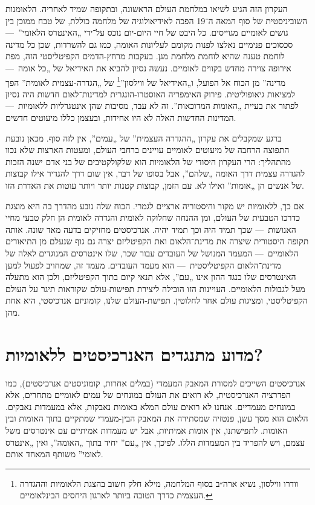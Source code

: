 העקרון הזה הגיע לשיאו במלחמת העולם הראשונה, ובתקופה שמיד לאחריה. הלאומנות השוביניסטית של סוף המאה ה־19 הפכה לאידיאולוגיה של מלחמה כוללת, של טבח ממוכן בין גושים לאומיים מגוייסים. כל היבט של חיי היום-יום נוכס על־ידי „האינטרס הלאומי”~— סכסוכים פנימיים נאלצו לפנות מקומם לעליונות האומה, כמו גם להשרדות, שכן כל מדינה לוחמת טענה שהיא לוחמת מלחמת מגן. בעקבות מרחץ-הדמים הקפיטליסטי הזה, מפת אירופה צוירה מחדש בקווים לאומיים. נעשה נסיון להביא את האידיאל של „כל אומה~— מדינה” מן הכוח אל הפועל, ו„האידיאל של ווילסון”\footnote{וודרו ווילסון, נשיא ארה״ב בסוף המלחמה, מילא חלק חשוב בהצגת הלאומיות וההגדרה העצמית כדרך הטובה ביותר לארגון היחסים הבינלאומיים.} של „הגדרה-עצמית לאומית” הפך למציאות גיאופוליטית. פירוק האימפריה האוסטרו-הונגרית למדינות־לאום חדשות היה נסיון לפתור את בעיית „האומות המדוכאות”. זה לא עבד, מסיבות שהן אינטגרליות ללאומיות~— המדינות החדשות האלה לא היו אחידות, ובעצמן כללו מיעוטים חדשים.

ברגע שמקבלים את עקרון „ההגדרה העצמית” של „עמים”, אין לזה סוף. מכאן נובעת התפוצה הרחבה של מיעוטים לאומיים עויינים ברחבי העולם, ומעטות הארצות שלא נכוו מהתהליך: הרי העקרון היסודי של הלאומיות הוא שלקולקטיבים של בני אדם ישנה הזכות להגדרה עצמית דרך האומה „שלהם”, אבל בסופו של דבר, אין שום דרך להגדיר אילו קבוצות של אנשים הן „אומות” ואילו לא. עם הזמן, קבוצות קטנות יותר ויותר עוטות את האדרת הזו.

אם כך, ללאומיות יש מקור והיסטוריה ארציים לגמרי. הכוח שלה נובע מהדרך בה היא מוצגת כדרכו הטבעית של העולם, ומן ההנחה שחלוקה לאומית והגדרה לאומית הן חלק טבעי מחיי האנושות~— שכך תמיד היה וכך תמיד יהיה. אנרכיסטים מחזיקים בדעה מאד שונה. אותה תקופה היסטורית שיצרה את מדינת־הלאום ואת הקפיטליזם יצרה גם גוף שנעלם מן התיאורים הלאומיים~— המעמד המנושל של העובדים עבור שכר, שלו אינטרסים המנוגדים לאלה של מדינת־הלאום הקפיטליסטית~— הוא מעמד העובדים. מעמד זה, שמחויב לפעול למען האינטרסים שלו כנגד ההון אינו „עם”, אלא תנאי קיום בתוך הקפיטליזם, ולכן הוא מתעלה מעל לגבולות הלאומיים. העויינות הזו הובילה ליצירת תפישות-עולם שקוראות תיגר על העולם הקפיטליסטי, ומציגות עולם אחר לחלוטין. תפישת-העולם שלנו, קומוניזם אנרכיסטי, היא אחת מהן.



\section*{מדוע מתנגדים האנרכיסטים ללאומיות?}

אנרכיסטים השייכים למסורת המאבק המעמדי (במלים אחרות, קומוניסטים אנרכיסטים), כמו הפדרציה האנרכיסטית, לא רואים את העולם במונחים של עמים לאומיים מתחרים, אלא במונחים מעמדיים. אנחנו לא רואים עולם המלא באומות נאבקות, אלא במעמדות נאבקים. הלאום הוא מסך עשן, פנטזיה שמסתירה את המאבק הבין-מעמדי שמתקיים בתוך האומות ובין האומות. לתפישתנו, אין אומות אמיתיות, אבל יש מעמדות אמיתיים עם אינטרסים משל עצמם, ויש להפריד בין המעמדות הללו. לפיכך, אין „עם” יחיד בתוך „האומה”, ואין „אינטרס לאומי” משותף המאחד אותם.

